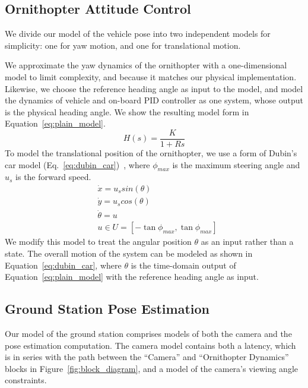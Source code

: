 \documentclass{aamas2013}
\begin{document}
\subsection{Ornithopter Attitude Control}
\label{sec:model_attitude}

We divide our model of the vehicle pose into two independent models for 
simplicity: one for yaw motion, and one for translational motion.

We approximate the yaw dynamics of the ornithopter with a one-dimensional 
model to limit complexity, and because it matches our physical 
implementation. Likewise, we choose the reference heading angle as input to 
the model, and model the dynamics of vehicle and on-board PID controller as 
one system, whose output is the physical heading angle. We show the 
resulting model form in Equation~\ref{eq:plain_model}.
\begin{equation}
\label{eq:plain_model}
H(s) = \frac{K}{1 + Rs}
\end{equation}
To model the translational position of the ornithopter, we use a form of 
Dubin's car model (Eq.~\ref{eq:dubin_car})~\cite{lavalle:planning}, where 
$\phi_{max}$ is the maximum steering angle and $u_{s}$ is the forward speed. 
\begin{equation}
\label{eq:dubin_car}
\begin{aligned}
& \dot{x} = u_{s}sin(\theta)\\
& \dot{y} = u_{s}cos(\theta)\\
& \dot{\theta} = u\\
& u \in U=[-\tan{\phi_{max}},\tan{\phi_{max}}]
\end{aligned}
\end{equation}
We modify this model to treat the angular position $\theta$ as an input 
rather than a state. The overall motion of the system can be modeled as shown 
in Equation~\ref{eq:dubin_car}, where $\theta$ is the time-domain output of 
Equation~\ref{eq:plain_model} with the reference heading angle as input.

\subsection{Ground Station Pose Estimation}

Our model of the ground station comprises models of both the camera and the
pose estimation computation. The camera model contains both a latency, which 
is in series with the path between the ``Camera'' and 
``Ornithopter Dynamics'' blocks in Figure~\ref{fig:block_diagram}, and a 
model of the camera's viewing angle constraints.
 
\end{document}
